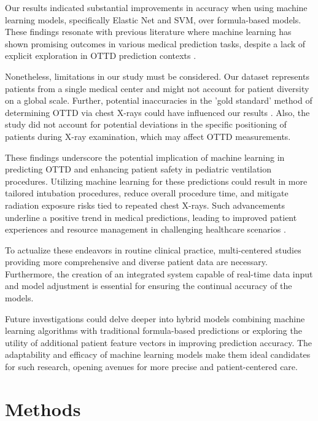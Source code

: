 \documentclass[11pt]{article}
\begin{document}
Our results indicated substantial improvements in accuracy when using machine learning models, specifically Elastic Net and SVM, over formula-based models. These findings resonate with previous literature where machine learning has shown promising outcomes in various medical prediction tasks, despite a lack of explicit exploration in OTTD prediction contexts \cite{Fang2020ImproveIH, Pirani2022ACA}. 

Nonetheless, limitations in our study must be considered. Our dataset represents patients from a single medical center and might not account for patient diversity on a global scale. Further, potential inaccuracies in the 'gold standard' method of determining OTTD via chest X-rays could have influenced our results \cite{Kerrey2009APC}. Also, the study did not account for potential deviations in the specific positioning of patients during X-ray examination, which may affect OTTD measurements.

These findings underscore the potential implication of machine learning in predicting OTTD and enhancing patient safety in pediatric ventilation procedures. Utilizing machine learning for these predictions could result in more tailored intubation procedures, reduce overall procedure time, and mitigate radiation exposure risks tied to repeated chest X-rays. Such advancements underline a positive trend in medical predictions, leading to improved patient experiences and resource management in challenging healthcare scenarios \cite{Hunyadi-Antievi2016EUROPEANRC, Licker2007PerioperativeMM}. 

To actualize these endeavors in routine clinical practice, multi-centered studies providing more comprehensive and diverse patient data are necessary. Furthermore, the creation of an integrated system capable of real-time data input and model adjustment is essential for ensuring the continual accuracy of the models.

Future investigations could delve deeper into hybrid models combining machine learning algorithms with traditional formula-based predictions or exploring the utility of additional patient feature vectors in improving prediction accuracy. The adaptability and efficacy of machine learning models make them ideal candidates for such research, opening avenues for more precise and patient-centered care.

\section*{Methods}
\end{document}
